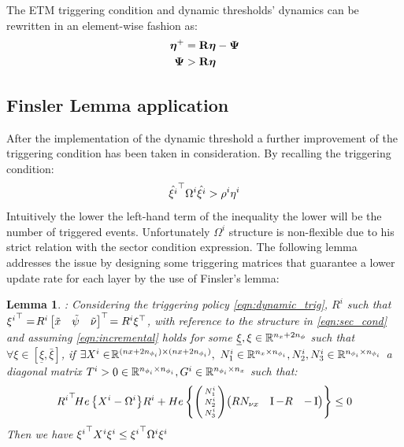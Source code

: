 \documentclass{ifacconf}
\theoremstyle{plain}
\newtheorem{lemma}{Lemma}
\begin{document}
The ETM triggering condition and dynamic thresholds' dynamics can be rewritten in an element-wise fashion as:
\begin{equation}
\begin{aligned}
    \boldsymbol{\eta}^+ &= {\bf{R}} \boldsymbol{\eta} - \mathbf{\Psi}\\
    \mathbf{\Psi} &> {\bf{R}} \boldsymbol{\eta}
\end{aligned}
\end{equation}

\subsection{Finsler Lemma application}
After the implementation of the dynamic threshold a further improvement of the triggering condition has been taken in consideration. By recalling the triggering condition:
$$
\hat{{\xi^i}}^\top \Omega^i \hat{\xi^i} > \rho^i \eta^i
$$
Intuitively the lower the left-hand term of the inequality the lower will be the number of triggered events. Unfortunately $\Omega^i$ structure is non-flexible due to his strict relation with the sector condition expression. The following lemma addresses the issue by designing some triggering matrices that guarantee a lower update rate for each layer by the use of Finsler's lemma:

\begin{lemma}\label{lem:finsler}: \emph{Considering the triggering policy \eqref{eqn:dynamic_trig}, $R^i$ such that ${\xi^i}^\top = \!R^i \left[\begin{matrix}\tilde{x} & \tilde{\psi} & \tilde{\nu}\end{matrix}\right]^\top\! = R^i \xi^\top$, with reference to the structure in \eqref{eqn:sec_cond} and assuming \eqref{eqn:incremental} holds for some $\underline{\xi}, \relax{\xi} \in {\mathbb{R}}^{n_x + 2n_{\phi}}$ such that $\forall \xi \in \left[ \underline{\xi}, \bar{\xi}\right]$, if $\exists X^i \in\! {\mathbb{R}}^{(nx + 2n_{\phi_i}) \times (nx + 2n_{\phi_i})},$ $N^i_1 \in {\mathbb{R}}^{n_x \times n_{\phi_i}}, N^i_2, N^i_3 \in {\mathbb{R}}^{n_{\phi_i} \times n_{\phi_i}}$ a diagonal matrix $T^i > 0 \in {\mathbb{R}}^{n_{\phi_i} \times n_{\phi_i}}, G^i \in {\mathbb{R}}^{n_{\phi_i} \times n_x}$ such that:
\begin{equation}\label{eqn:finsler}
     {R^i}^\top\! He\left\{X^i - \Omega^i\right\}\! R^i + He\left\{ \left(\begin{smallmatrix} N^i_1\\ N^i_2\\ N^i_3 \end{smallmatrix} \right)\! \left(\begin{matrix}R N_{\nu x} & \operatorname{I} - R & -\operatorname{I}\end{matrix}\right)\right\} \leq 0
\end{equation}
Then we have ${\xi^i}^\top X^i \xi^i \leq {\xi^i}^\top \Omega^i \xi^i$}
\end{lemma}
\end{document}
